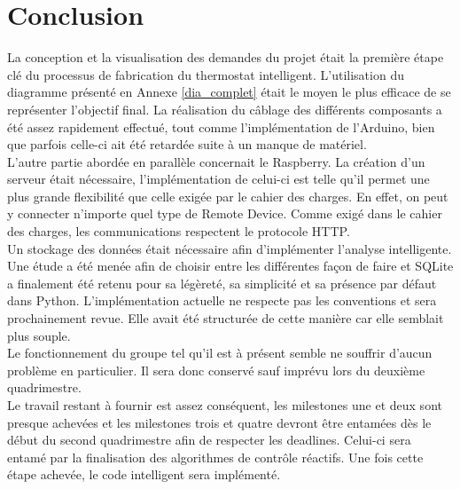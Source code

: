 \documentclass[11pt,a4paper,11pt]{report}
\begin{document}
\newpage

\chapter{Conclusion}

La conception et la visualisation des demandes du projet était la première étape clé du processus de fabrication du thermostat intelligent. L'utilisation du diagramme présenté en Annexe \ref{dia_complet} était le moyen le plus efficace de se représenter l'objectif final. La réalisation du câblage des différents composants a été assez rapidement effectué, tout comme l'implémentation de l'Arduino, bien que parfois celle-ci ait été retardée suite à un manque de matériel.\\

L'autre partie abordée en parallèle concernait le Raspberry. La création d'un serveur était nécessaire, l'implémentation de celui-ci est telle qu'il permet une plus grande flexibilité que celle exigée par le cahier des charges. En effet, on peut y connecter n'importe quel type de Remote Device. Comme exigé dans le cahier des charges, les communications respectent le protocole HTTP.\\

Un stockage des données était nécessaire afin d'implémenter l'analyse intelligente. Une étude a été menée afin de choisir entre les différentes façon de faire et SQLite a finalement été retenu pour sa légèreté, sa simplicité et sa présence par défaut dans Python. L'implémentation actuelle ne respecte pas les conventions et sera prochainement revue. Elle avait été structurée de cette manière car elle semblait plus souple.\\

Le fonctionnement du groupe tel qu'il est à présent semble ne souffrir d'aucun problème en particulier. Il sera donc conservé sauf imprévu lors du deuxième quadrimestre.\\

Le travail restant à fournir est assez conséquent, les milestones une et deux sont presque achevées et les milestones trois et quatre devront être entamées dès le début du second quadrimestre afin de respecter les deadlines. Celui-ci sera entamé par la finalisation des algorithmes de contrôle réactifs. Une fois cette étape achevée, le code intelligent sera implémenté.
\end{document}
